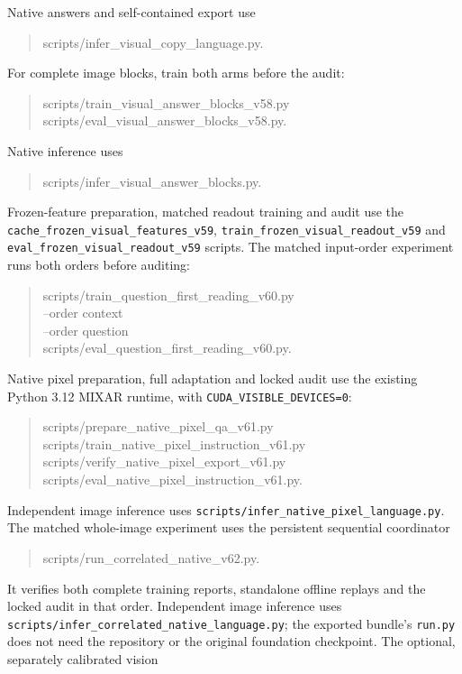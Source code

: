 \documentclass[10pt,a4paper]{article}
\begin{document}
Native answers and self-contained export use
\begin{quote}\small\ttfamily
scripts/infer\_visual\_copy\_language.py.
\end{quote}
For complete image blocks, train both arms before the audit:
\begin{quote}\small\ttfamily
scripts/train\_visual\_answer\_blocks\_v58.py\\
scripts/eval\_visual\_answer\_blocks\_v58.py.
\end{quote}
Native inference uses
\begin{quote}\small\ttfamily
scripts/infer\_visual\_answer\_blocks.py.
\end{quote}
Frozen-feature preparation, matched readout training and audit use the
\texttt{cache\_frozen\_visual\_features\_v59},
\texttt{train\_frozen\_visual\_readout\_v59} and
\texttt{eval\_frozen\_visual\_readout\_v59} scripts.
The matched input-order experiment runs both orders before auditing:
\begin{quote}\small\ttfamily
scripts/train\_question\_first\_reading\_v60.py\\
--order context\\
--order question\\
scripts/eval\_question\_first\_reading\_v60.py.
\end{quote}
Native pixel preparation, full adaptation and locked audit use the existing
Python 3.12 MIXAR runtime, with \texttt{CUDA\_VISIBLE\_DEVICES=0}:
\begin{quote}\small\ttfamily
scripts/prepare\_native\_pixel\_qa\_v61.py\\
scripts/train\_native\_pixel\_instruction\_v61.py\\
scripts/verify\_native\_pixel\_export\_v61.py\\
scripts/eval\_native\_pixel\_instruction\_v61.py.
\end{quote}
Independent image inference uses
\texttt{scripts/infer\_native\_pixel\_language.py}.
The matched whole-image experiment uses the persistent sequential coordinator
\begin{quote}\small\ttfamily
scripts/run\_correlated\_native\_v62.py.
\end{quote}
It verifies both complete training reports, standalone offline replays and
the locked audit in that order. Independent image inference uses
\texttt{scripts/infer\_correlated\_native\_language.py};
the exported bundle's \texttt{run.py} does not need the repository or the
original foundation checkpoint. The optional, separately calibrated vision
\end{document}

